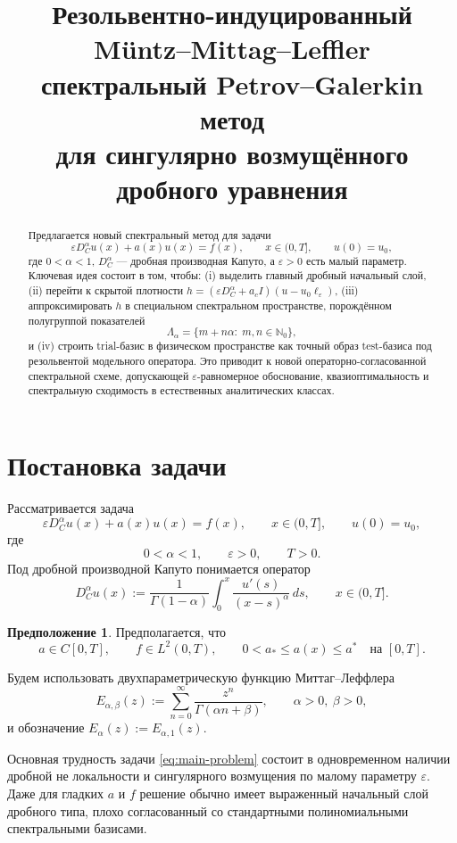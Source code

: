\documentclass[12pt,a4paper]{article}
\title{Резольвентно-индуцированный Müntz--Mittag--Leffler\\
спектральный Petrov--Galerkin метод\\
для сингулярно возмущённого дробного уравнения}
\author{}
\date{}
\theoremstyle{definition}
\newtheorem{assumption}[theorem]{Предположение}
\newcommand{\eps}{\varepsilon}
\newcommand{\Nc}{\mathbb{N}_0}
\newcommand{\Dc}{D_C^\alpha}
\begin{document}
\maketitle

\begin{abstract}
Предлагается новый спектральный метод для задачи
\[
\eps \Dc u(x)+a(x)u(x)=f(x), \qquad x\in(0,T], \qquad u(0)=u_0,
\]
где $0<\alpha<1$, $\Dc$ --- дробная производная Капуто, а $\eps>0$ есть малый параметр.
Ключевая идея состоит в том, чтобы:
(i) выделить главный дробный начальный слой,
(ii) перейти к скрытой плотности $h=(\eps \Dc + a_c I)(u-u_0\ell_\eps)$,
(iii) аппроксимировать $h$ в специальном спектральном пространстве, порождённом полугруппой показателей
\[
\Lambda_\alpha=\{m+n\alpha:\; m,n\in\Nc\},
\]
и
(iv) строить trial-базис в физическом пространстве как точный образ test-базиса под резольвентой модельного оператора.
Это приводит к новой операторно-согласованной спектральной схеме, допускающей
$\eps$-равномерное обоснование, квазиоптимальность и спектральную сходимость
в естественных аналитических классах.
\end{abstract}

\section{Постановка задачи}

Рассматривается задача
\begin{equation}
\label{eq:main-problem}
\eps \Dc u(x)+a(x)u(x)=f(x), \qquad x\in(0,T], \qquad u(0)=u_0,
\end{equation}
где
\[
0<\alpha<1,\qquad \eps>0,\qquad T>0.
\]
Под дробной производной Капуто понимается оператор
\begin{equation}
\label{eq:caputo}
\Dc u(x):=
\frac{1}{\Gamma(1-\alpha)}\int_0^x \frac{u'(s)}{(x-s)^\alpha}\,ds,
\qquad x\in(0,T].
\end{equation}

\begin{assumption}
\label{ass:a-f}
Предполагается, что
\[
a\in C[0,T], \qquad f\in L^2(0,T), \qquad 0<a_*\le a(x)\le a^* \quad \text{на } [0,T].
\]
\end{assumption}

Будем использовать двухпараметрическую функцию Миттаг--Леффлера
\[
E_{\alpha,\beta}(z):=\sum_{n=0}^\infty \frac{z^n}{\Gamma(\alpha n+\beta)},
\qquad \alpha>0,\ \beta>0,
\]
и обозначение $E_\alpha(z):=E_{\alpha,1}(z)$.

Основная трудность задачи \eqref{eq:main-problem} состоит в одновременном наличии
дробной не локальности и сингулярного возмущения по малому параметру $\eps$.
Даже для гладких $a$ и $f$ решение обычно имеет выраженный начальный слой
дробного типа, плохо согласованный со стандартными полиномиальными спектральными базисами.
\end{document}
